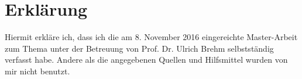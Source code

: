 \newpage
\section*{Erklärung}

Hiermit erkläre ich, dass ich die am 8. November 2016 eingereichte Master-Arbeit zum Thema \makeatletter\emph{\@title} \makeatother unter der Betreuung von Prof. Dr. Ulrich Brehm selbstständig verfasst habe. Andere als die angegebenen Quellen und Hilfsmittel wurden von mir nicht benutzt.

